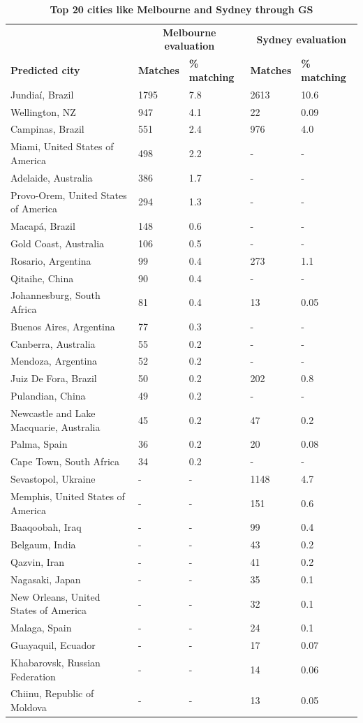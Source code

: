 \documentclass[Crown,sageh,times]{sagej}
\begin{document}
\begin{table}[!htbp]
\caption{\bf Top 20 cities like Melbourne and Sydney through GS \label{tab:melbournesydneyGS}}     
\begin{tabular}{ l  l l l  l}
 \hline    &  \multicolumn{2}{c}{\textbf{Melbourne evaluation}} & \multicolumn{2}{c}{\textbf{Sydney evaluation}}  \\  
\textbf{Predicted city} & \textbf{Matches} & \textbf{\% matching}  & \textbf{Matches} & \textbf{\% matching}\\ \hline
Jundia\'{i}, Brazil&1795&7.8&	2613&	10.6\\
Wellington, NZ&	947&	4.1&	22&	0.09\\
Campinas, Brazil&	551&	2.4&	976&	4.0\\
Miami, United States of America&	498&	2.2&-&- \\
Adelaide, Australia&	386&	1.7&-&- \\
Provo-Orem, United States of America&	294&	1.3&-&- \\
Macap\'{a}, Brazil&	148&	0.6&-&- \\
Gold Coast, Australia&	106&	0.5&-&- \\
Rosario, Argentina&	99&	0.4&	273&	1.1\\
Qitaihe, China&	90&	0.4&-&- \\
Johannesburg, South Africa&	81&	0.4&	13&	0.05\\
Buenos Aires, Argentina&	77&	0.3&-&- \\
Canberra, Australia&	55&	0.2&-&- \\
Mendoza, Argentina&	52&	0.2&-&- \\
Juiz De Fora, Brazil&	50&	0.2&	202&	0.8\\
Pulandian, China&	49&	0.2&-&- \\
Newcastle and Lake Macquarie, Australia&	45&	0.2&	47&	0.2\\
Palma, Spain&	36&	0.2&	20&	0.08\\
Cape Town, South Africa&	34&	0.2&-&- \\
Sevastopol, Ukraine&-&-&	1148&	4.7\\
Memphis, United States of America&-&-&	151&	0.6\\
Baaqoobah, Iraq&-&-&	99&	0.4\\
Belgaum, India&-&-&	43&	0.2\\
Qazvin, Iran&-&- &	41&	0.2\\
Nagasaki, Japan&-&-	&35&	0.1\\
New Orleans, United States of America&-&-&	32&	0.1\\
Malaga, Spain&-&-&	24&	0.1\\
Guayaquil, Ecuador&-&-&	17&	0.07\\
Khabarovsk, Russian Federation&-&-&	14&	0.06\\
Chiinu, Republic of Moldova&-&-&	13&	0.05\\

\hline
\end{tabular}
\end{table}
\end{document}

